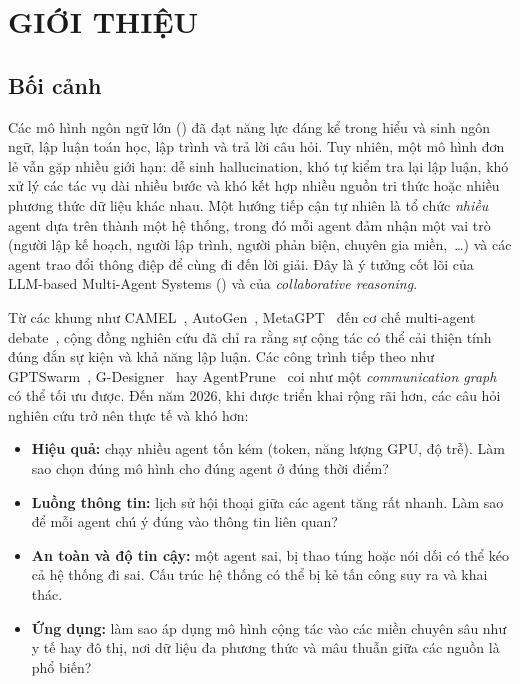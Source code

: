 \chapter{GIỚI THIỆU}
\label{chap:intro}

\section{Bối cảnh}

Các mô hình ngôn ngữ lớn (\LLM) đã đạt năng lực đáng kể trong hiểu và sinh ngôn ngữ, lập luận toán học, lập trình và trả lời câu hỏi. Tuy nhiên, một mô hình đơn lẻ vẫn gặp nhiều giới hạn: dễ sinh hallucination, khó tự kiểm tra lại lập luận, khó xử lý các tác vụ dài nhiều bước và khó kết hợp nhiều nguồn tri thức hoặc nhiều phương thức dữ liệu khác nhau. Một hướng tiếp cận tự nhiên là tổ chức \emph{nhiều} agent dựa trên \LLM{} thành một hệ thống, trong đó mỗi agent đảm nhận một vai trò (người lập kế hoạch, người lập trình, người phản biện, chuyên gia miền,~\ldots) và các agent trao đổi thông điệp để cùng đi đến lời giải. Đây là ý tưởng cốt lõi của LLM-based Multi-Agent Systems (\MAS) và của \emph{collaborative reasoning}.

Từ các khung như CAMEL~\cite{camel}, AutoGen~\cite{autogen}, MetaGPT~\cite{metagpt} đến cơ chế multi-agent debate~\cite{du2024debate}, cộng đồng nghiên cứu đã chỉ ra rằng sự cộng tác có thể cải thiện tính đúng đắn sự kiện và khả năng lập luận. Các công trình tiếp theo như GPTSwarm~\cite{gptswarm}, G-Designer~\cite{gdesigner} hay AgentPrune~\cite{agentprune} coi \MAS{} như một \emph{communication graph} có thể tối ưu được. Đến năm 2026, khi \MAS{} được triển khai rộng rãi hơn, các câu hỏi nghiên cứu trở nên thực tế và khó hơn:
\begin{itemize}
  \item \textbf{Hiệu quả:} chạy nhiều agent tốn kém (token, năng lượng GPU, độ trễ). Làm sao chọn đúng mô hình cho đúng agent ở đúng thời điểm?
  \item \textbf{Luồng thông tin:} lịch sử hội thoại giữa các agent tăng rất nhanh. Làm sao để mỗi agent chú ý đúng vào thông tin liên quan?
  \item \textbf{An toàn và độ tin cậy:} một agent sai, bị thao túng hoặc nói dối có thể kéo cả hệ thống đi sai. Cấu trúc hệ thống có thể bị kẻ tấn công suy ra và khai thác.
  \item \textbf{Ứng dụng:} làm sao áp dụng mô hình cộng tác vào các miền chuyên sâu như y tế hay đô thị, nơi dữ liệu đa phương thức và mâu thuẫn giữa các nguồn là phổ biến?
\end{itemize}

